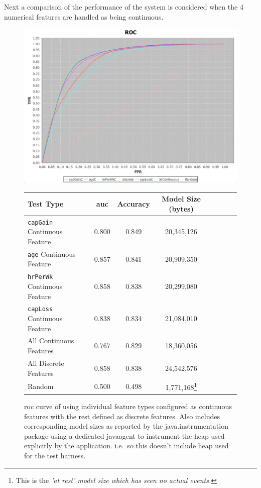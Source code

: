 \documentclass[a4paper,11pt]{scrreprt}
\begin{document}
\clearpage
Next a comparison of the performance of the system is considered when the 4 numerical features are handled as being continuous.
\begin{figure}[h!]
\centering
\caption{\acrshort{roc} curve of using individual feature types configured as continuous features with the rest defined as discrete features. Also includes corresponding model sizes as reported by the java.instrumentation package using a dedicated javaagent to instrument the heap used explicitly by the application. i.e.\ so this doesn't include heap used for the test harness.}
\includegraphics[scale=0.50, trim=0 -25 0 2, clip=true] {continuous_features_adult_earnings.png}
\label{fig:adultwagesresults2}
\begin{tabular}{l*{6}{c}r}
Test Type & \acrshort{auc} & Accuracy & Model Size (bytes)\\
\hline
\verb|capGain| Continuous Feature & 0.800 & 0.849 & 20,345,126 & \\
\verb|age| Continuous Feature & 0.857 & 0.841 & 20,909,350\\
\verb|hrPerWk| Continuous Feature & 0.858 & 0.838 & 20,299,080\\
\verb|capLoss| Continuous Feature & 0.838 & 0.834 & 21,084,010\\
All Continuous Features & 0.767 & 0.829 & 18,360,056\\
All Discrete Features & 0.858 & 0.838 & 24,542,576\\
Random & 0.500 & 0.498 & 1,771,168\footnote{This is the \it{'at rest'} model size which has seen no actual events.}
\end{tabular}
\end{figure}
\end{document}
